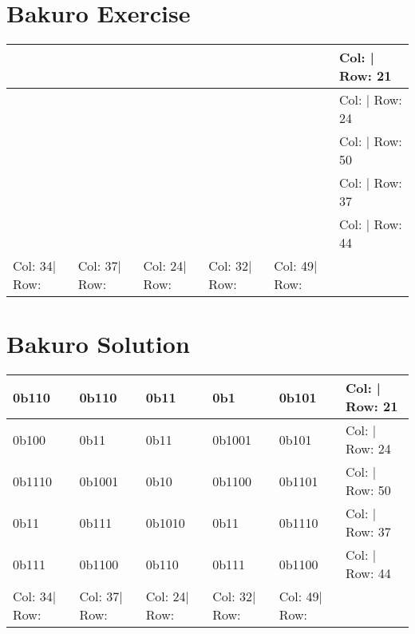 \documentclass[]{article}
\begin{document}
            \section{Bakuro Exercise}\begin{tabular}{|l||l||l||l||l||l|}
\hline
               &               &               &               &               & Col: | Row: 21 \\ \hline
               &               &               &               &               & Col: | Row: 24 \\ \hline
               &               &               &               &               & Col: | Row: 50 \\ \hline
               &               &               &               &               & Col: | Row: 37 \\ \hline
               &               &               &               &               & Col: | Row: 44 \\ \hline
 Col: 34| Row: & Col: 37| Row: & Col: 24| Row: & Col: 32| Row: & Col: 49| Row: &                \\ \hline
\hline
\end{tabular}\newpage 
 \section{Bakuro Solution} 
\begin{tabular}{|l||l||l||l||l||l|}
\hline
 0b110         & 0b110         & 0b11          & 0b1           & 0b101         & Col: | Row: 21 \\ \hline
 0b100         & 0b11          & 0b11          & 0b1001        & 0b101         & Col: | Row: 24 \\ \hline
 0b1110        & 0b1001        & 0b10          & 0b1100        & 0b1101        & Col: | Row: 50 \\ \hline
 0b11          & 0b111         & 0b1010        & 0b11          & 0b1110        & Col: | Row: 37 \\ \hline
 0b111         & 0b1100        & 0b110         & 0b111         & 0b1100        & Col: | Row: 44 \\ \hline
 Col: 34| Row: & Col: 37| Row: & Col: 24| Row: & Col: 32| Row: & Col: 49| Row: &                \\ \hline
\hline
\end{tabular}\newpage 
\end{document}

